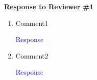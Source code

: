 \begin{center}
{\LARGE \textbf{Response to Reviewer \#1} \par}
\end{center}


\begin{enumerate}
  \item Comment1

  \textcolor{blue}{Response}
  \item Comment2

  \textcolor{blue}{Response}
\end{enumerate}
